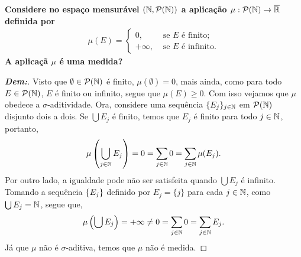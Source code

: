 \biglinend
\newpage 
{}
\myexe{\thedois}
\bigline
\textbf{Considere no espaço 
mensurável $(\mathbb N, \mathcal P(\mathbb N))$ a aplicação $\mu: \mathcal 
P(\mathbb N) \rightarrow \overline {\mathbb R}$
definida por 
\begin{align*}
  \mu(E) = \begin{cases}
    0, &\text{ se $E$ é finito;}\\
    +\infty, &\text{ se $E$ é infinito.}
  \end{cases}
\end{align*}
A aplicaçã $\mu$ é uma medida?
}
\begin{proof}[\textbf{Dem:}]
  Visto que $\emptyset \in \mathcal P(\mathbb N)$ é finito, 
  $\mu(\emptyset) = 0$, mais ainda, como para todo 
  $E \in \mathcal P (\mathbb N)$, $E$ é finito ou infinito, segue que $\mu(E) \ge 0$. Com isso
  vejamos que $\mu$ obedece a $\sigma$-aditividade. Ora, considere uma sequência  
  $\{E_j\}_{j \in \mathbb N}$ em $\mathcal P(\mathbb N)$ disjunto dois a dois. Se $\bigcup E_j$
  é finito, temos que $E_j$ é finito para todo $j \in \mathbb N$, portanto, 
  \begin{align*}
    \mu\left(\bigcup_{j \in \mathbb N} E_j\right) = 0 = \sum_{j \in \mathbb N} 0
    = \sum_{j \in \mathbb N} \mu(E_j). 
  \end{align*}
  Por outro lado, a igualdade pode não ser satisfeita quando 
  $\bigcup E_j$ é infinito. Tomando a sequência $\left\{E_j\right\}$
  definido por $E_j = \{j\}$ para cada $j \in \mathbb N$, como $\bigcup E_j = \mathbb N$, segue que, 
  \begin{align*}
    \mu\left(\bigcup E_j\right) = +\infty \neq 0 = \sum_{j \in \mathbb N} 0 = \sum_{j \in \mathbb N} E_j.
  \end{align*}
  Já que $\mu$ não é $\sigma$-aditiva, temos que $\mu$ não é medida.
\end{proof}

